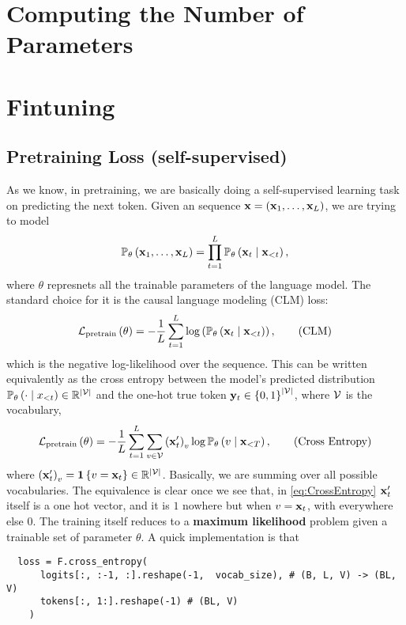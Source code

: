 \documentclass[11pt]{article}  %
\begin{document}
\section{Computing the Number of Parameters}


\section{Fintuning}

\subsection{Pretraining Loss (self-supervised)}
As we know, in pretraining, we are basically doing a self-supervised learning task on predicting the next token.
Given an sequence $\mathbf{x} = (\mathbf{x}_1, \hdots, \mathbf{x}_L)$, we are trying to model 
\begin{align*}
  \mathbb{P}_{\theta}\left( \mathbf{x}_1, \hdots, \mathbf{x}_L \right) = \prod_{t=1}^L \mathbb{P}_{\theta}\left( \mathbf{x}_t \mid \mathbf{x}_{< t} \right),
\end{align*}
where $\theta$ represnets all the trainable parameters of the language model. 
The standard choice for it is the causal language modeling (CLM) loss:
\begin{align}
  \label{eq:CLM}
  \mathcal{L}_{\text{pretrain}} \left( \theta \right) = -\frac{1}{L}\sum_{t=1}^{L}\log\left( \mathbb{P}_{\theta}\left( \mathbf{x}_t \mid \mathbf{x}_{<t} \right) \right), \tag{CLM}
\end{align}
which is the negative log-likelihood over the sequence.
This can be written equivalently as the cross entropy between the model's predicted distribution $\mathbb{P}_{\theta}\left( \cdot \mid x_{< t} \right) \in \mathbb{R}^{\lvert\mathcal{V} \rvert}$ and the one-hot true token $\mathbf{y}_t \in \left\{ 0, 1 \right\}^{\lvert\mathcal{V} \rvert}$, where $\mathcal{V}$ is the vocabulary,
\begin{align}
  \label{eq:CrossEntropy}
  \mathcal{L}_{\text{pretrain}}\left( \theta \right) = -\frac{1}{L}\sum_{t=1}^{L}\sum_{v \in \mathcal{V}} \left( \mathbf{x}^\prime_{t} \right)_v \log \mathbb{P}_{\theta}\left( v \mid \mathbf{x}_{<T} \right), \tag{Cross Entropy}
\end{align} 
where $\left( \mathbf{x}^\prime_t \right)_v = \mathbf{1}\left\{ v = \mathbf{x}_t \right\} \in \mathbb{R}^{\lvert\mathcal{V}\rvert}$.
Basically, we are summing over all possible vocabularies.
The equivalence is clear once we see that, in \eqref{eq:CrossEntropy} $\mathbf{x}^\prime_t$ itself is a one hot vector, and it is $1$ nowhere but when $v = \mathbf{x}_t$, with everywhere else $0$.
The training itself reduces to a \textbf{maximum likelihood} problem given a trainable set of parameter $\theta$.  
A quick implementation is that 
\begin{verbatim}
  loss = F.cross_entropy(
      logits[:, :-1, :].reshape(-1,  vocab_size), # (B, L, V) -> (BL, V)
      tokens[:, 1:].reshape(-1) # (BL, V)
    )
\end{verbatim}
\end{document}

